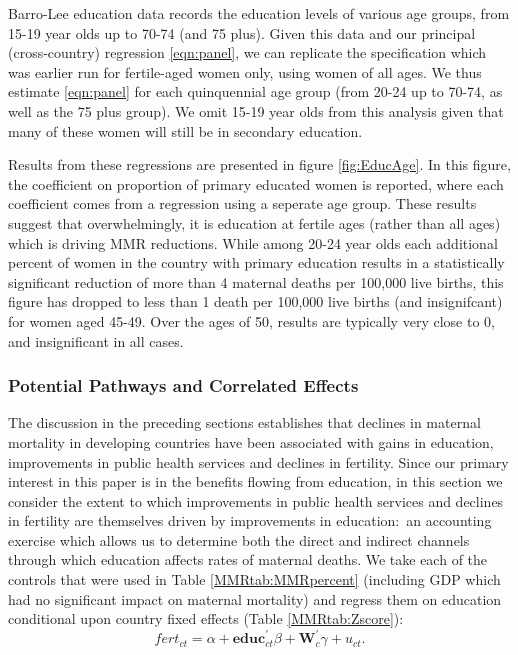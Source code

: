 \documentclass{article}[12pt,subeqn]
\begin{document}
\begin{spacing}{1.4}
Barro-Lee education data records the education levels of various age groups,
from 15-19 year olds up to 70-74 (and 75 plus).  Given this data and our
principal (cross-country) regression \ref{eqn:panel}, we can replicate the
specification which was earlier run for fertile-aged women only, using women of
all ages.  We thus estimate \ref{eqn:panel} for each quinquennial age group
(from 20-24 up to 70-74, as well as the 75 plus group).  We omit
15-19 year olds from this analysis given that many of these women will still
be in secondary education.

Results from these regressions are presented in figure \ref{fig:EducAge}. In
this figure, the coefficient on proportion of primary educated women is reported,
where each coefficient comes from a regression using a seperate age group.
These results suggest that overwhelmingly, it is education at fertile ages (rather
than all ages) which is driving MMR reductions.  While among 20-24 year olds
each additional percent of women in the country with primary education results in
a statistically significant reduction of more than 4 maternal deaths per 100,000
live births, this figure has dropped to less than 1 death per
100,000 live births (and insignifcant) for women aged 45-49.  Over the ages
of 50, results are typically very close to 0, and insignificant in all cases.


\subsubsection{Potential Pathways and Correlated Effects}
\label{ssscn:effects}
The discussion in the preceding sections establishes that declines in maternal 
mortality in developing countries have been associated with gains in education, 
improvements in public health services and declines in fertility. Since our 
primary interest in this paper is in the benefits flowing from education, in this 
section we consider the extent to which improvements in public health services and 
declines in fertility are themselves driven by improvements in education:\ an
accounting exercise which allows us to determine both the direct and indirect
channels through which education affects rates of maternal deaths. We take 
each of the controls that were used in Table \ref{MMRtab:MMRpercent} (including 
GDP which had no significant impact on maternal mortality) and regress them on 
education conditional upon country fixed effects (Table \ref{MMRtab:Zscore}):
\begin{equation}
\label{eqn:Zscore}
  fert_{ct}=\alpha + \mathbf{educ}^\prime_{ct}\beta + \mathbf{W}^\prime_c\gamma 
  + u_{ct}.
\end{equation}


\end{spacing}
\end{document}
